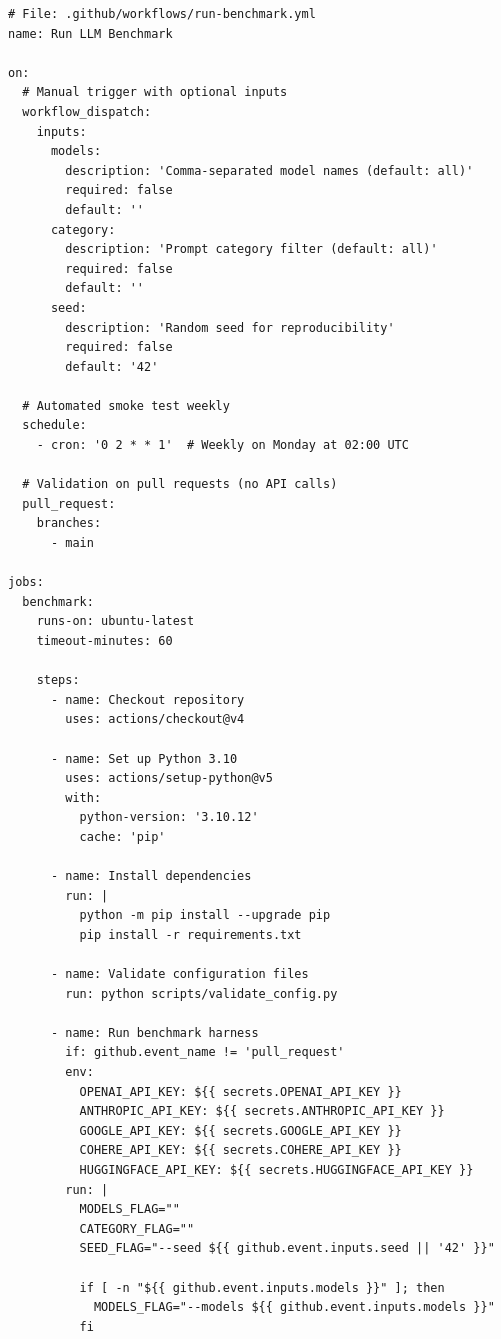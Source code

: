 \begin{lstlisting}[basicstyle=\ttfamily\footnotesize,breaklines=true,frame=single,caption={Complete GitHub Actions workflow for automated benchmark execution.\label{lst:github_actions_full}}]
# File: .github/workflows/run-benchmark.yml
name: Run LLM Benchmark

on:
  # Manual trigger with optional inputs
  workflow_dispatch:
    inputs:
      models:
        description: 'Comma-separated model names (default: all)'
        required: false
        default: ''
      category:
        description: 'Prompt category filter (default: all)'
        required: false
        default: ''
      seed:
        description: 'Random seed for reproducibility'
        required: false
        default: '42'
  
  # Automated smoke test weekly
  schedule:
    - cron: '0 2 * * 1'  # Weekly on Monday at 02:00 UTC
  
  # Validation on pull requests (no API calls)
  pull_request:
    branches:
      - main

jobs:
  benchmark:
    runs-on: ubuntu-latest
    timeout-minutes: 60
    
    steps:
      - name: Checkout repository
        uses: actions/checkout@v4
      
      - name: Set up Python 3.10
        uses: actions/setup-python@v5
        with:
          python-version: '3.10.12'
          cache: 'pip'
      
      - name: Install dependencies
        run: |
          python -m pip install --upgrade pip
          pip install -r requirements.txt
      
      - name: Validate configuration files
        run: python scripts/validate_config.py
      
      - name: Run benchmark harness
        if: github.event_name != 'pull_request'
        env:
          OPENAI_API_KEY: ${{ secrets.OPENAI_API_KEY }}
          ANTHROPIC_API_KEY: ${{ secrets.ANTHROPIC_API_KEY }}
          GOOGLE_API_KEY: ${{ secrets.GOOGLE_API_KEY }}
          COHERE_API_KEY: ${{ secrets.COHERE_API_KEY }}
          HUGGINGFACE_API_KEY: ${{ secrets.HUGGINGFACE_API_KEY }}
        run: |
          MODELS_FLAG=""
          CATEGORY_FLAG=""
          SEED_FLAG="--seed ${{ github.event.inputs.seed || '42' }}"
          
          if [ -n "${{ github.event.inputs.models }}" ]; then
            MODELS_FLAG="--models ${{ github.event.inputs.models }}"
          fi
          

\end{lstlisting}
